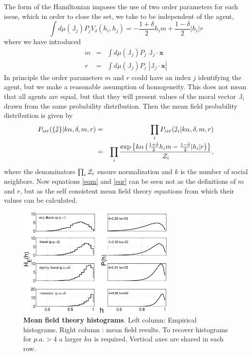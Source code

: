 \documentclass[twocolumn,showpacs]{revtex4-1}
\begin{document}
The form of the Hamiltonian imposes the use of two order parameters
for each issue, which in order to close the set, we take to be
independent of the agent, 
\begin{equation}
\int   d\mu(\mathbb{J}_j)
P_j
V_\delta(h_i,h_j) =-\frac{1+\delta}{2} h_i m
 +\frac{1-\delta}{2} |h_i| r
\end{equation}
where we have introduced
\begin{eqnarray}
m& =& \int   d\mu(\mathbb{J}_j) P_j \;
\mathbb{J}_j \cdot \mathbf{x}  \label{eqm}
\\
r &=& \int   d\mu(\mathbb{J}_j) P_j \;
|\mathbb{J}_j\cdot \mathbf{x}|
 \label{eqr}
\end{eqnarray}
In principle the order parameters $m$ and $r$ could
have an index $j$ identifying the agent, but we make 
a reasonable assumption of homogeneity. This does not
mean that all agents are equal, but that they will
present values of the moral vector $\mathbb{J}_i$ 
drawn  from the same probability distribution.
Then the mean field 
probability distribution is given by
\begin{eqnarray}
P_{\mbox{\tiny MF}}(\{\mathbb{J}\}|k\alpha, \delta,m, r)
&=& \prod_{i}P_{\mbox{\tiny MF}}(\mathbb{J}_i|k\alpha, \delta,m, r) \\
&=& \prod_{i}\frac{\exp \left\{
 k \alpha
\left( \frac{1+\delta}{2} h_i m
 -\frac{1-\delta}{2}  | h_i| r\right)\right\}}{{\cal Z}_i},\nonumber
\label{PMFT}
\end{eqnarray}
where the denominators $\prod_i {\cal Z}_i$ ensure normalization
and  $k$ is the number of social neighbors.
Now equations \ref{eqm} and 
\ref{eqr} can  be seen not as the definitions of $m$ 
and $r$, but as the self consistent
mean field theory equations
from which their values can be calculated.

\begin{widetext} 
\begin{figure}[!ht]
\centering \includegraphics[width=0.7\textwidth]{fig7_mfhist.eps}
\centering \caption{{\bf Mean field theory histograms}. 
Left column: Empirical histograms. Right column : mean field results. To recover histograms for $p.a.>4$ a larger $k\alpha$ is required. Vertical axes are shared in each row.
 }\label{fig:histogramMF}
\end{figure}
\end{widetext}
\end{document}
